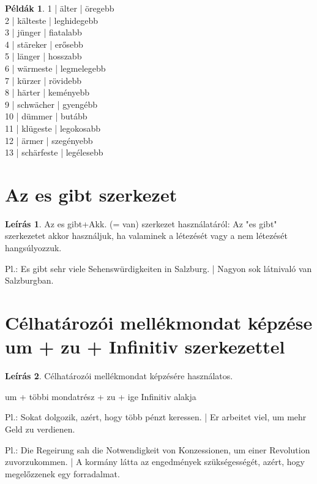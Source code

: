 \documentclass{article}
\theoremstyle{definition}
\newtheorem*{exmp}{Példák}
\newtheorem*{desc}{Leírás}
\begin{document}
\begin{exmp}
1 | älter | öregebb\\
2 | kälteste | leghidegebb\\
3 | jünger | fiatalabb\\
4 | stäreker | erősebb\\
5 | länger | hosszabb\\
6 | wärmeste | legmelegebb\\
7 | kürzer | rövidebb\\
8 | härter | keményebb\\
9 | schwächer | gyengébb\\
10 | dümmer | butább\\
11 | klügeste | legokosabb\\
12 | ärmer | szegényebb\\
13 | schärfeste | legélesebb\\
\end{exmp}

\section{Az es gibt szerkezet}

\begin{desc}
Az es gibt+Akk. (= van) szerkezet használatáról: Az "es gibt" szerkezetet akkor használjuk, ha valaminek a létezését vagy a nem létezését hangsúlyozzuk.

Pl.: Es gibt sehr viele Sehenswürdigkeiten in Salzburg. | Nagyon sok látnivaló van Salzburgban.
\end{desc}

\section{Célhatározói mellékmondat képzése um + zu + Infinitiv szerkezettel}

\begin{desc}
Célhatározói mellékmondat képzésére használatos.

um + többi mondatrész + zu + ige Infinitiv alakja

Pl.: Sokat dolgozik, azért, hogy több pénzt keressen. | Er arbeitet viel, um mehr Geld zu verdienen.

Pl.: Die Regeirung sah die Notwendigkeit von Konzessionen, um einer Revolution zuvorzukommen. | A kormány látta az engedmények szükségességét, azért, hogy megelőzzenek egy forradalmat.
\end{desc}
\end{document}
